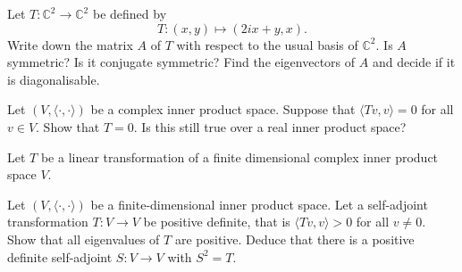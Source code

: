 \documentclass[answers]{exam}
\begin{document}
\begin{questions}



\question%
Let $T: \mathbb{C}^{2} \to \mathbb{C}^{2}$ be defined by \[
	T:(x, y) \mapsto(2 i x+y, x).
\] Write down the matrix $A$ of $T$ with respect to the usual basis of $\mathbb{C}^{2}$. Is $A$ symmetric? Is it conjugate symmetric? Find the eigenvectors of $A$ and decide if it is diagonalisable.



\question%
Let $(V,\langle\cdot,\cdot\rangle)$ be a complex inner product space. Suppose that $\langle T v, v\rangle=0$ for all $v \in V$. Show that $T=0$. Is this still true over a real inner product space?



\question%
Let $T$ be a linear transformation of a finite dimensional complex inner product space $V$.



\question%
Let $(V,\langle\cdot,\cdot\rangle)$ be a finite-dimensional inner product space. Let a self-adjoint transformation $T: V \to V$ be positive definite, that is $\langle T v, v\rangle>0$ for all $v \neq 0$. Show that all eigenvalues of $T$ are positive. Deduce that there is a positive definite self-adjoint $S: V \to V$ with $S^{2}=T$.




\end{questions}
\end{document}
